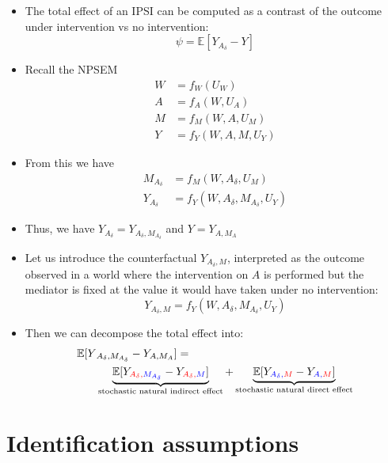 \documentclass[
  12pt,
]{book}
\theoremstyle{definition}
\theoremstyle{definition}
\theoremstyle{definition}
\newcommand{\E}{\mathbb{E}}
\newcommand{\1}{\mathbbm{1}}
\begin{document}
\begin{itemize}
\item
  The total effect of an IPSI can be computed as a contrast of the outcome under
  intervention vs no intervention:
  \begin{equation*}
    \psi = \E[Y_{A_\delta} - Y]
  \end{equation*}
\item
  Recall the NPSEM
  \begin{align}
    W & = f_W(U_W)\\
    A & = f_A(W, U_A)\\
    M & = f_M(W, A, U_M)\\
    Y & = f_Y(W, A, M, U_Y)
  \end{align}
\item
  From this we have
  \begin{align*}
  M_{A_\delta} & = f_M(W, A_\delta, U_M)\\
  Y_{A_\delta} & = f_Y(W, A_\delta, M_{A_\delta}, U_Y)
  \end{align*}
\item
  Thus, we have \(Y_{A_\delta} = Y_{A_\delta, M_{A_\delta}}\) and \(Y = Y_{A,M_{A}}\)
\item
  Let us introduce the counterfactual \(Y_{A_\delta, M}\), interpreted as the
  outcome observed in a world where the intervention on \(A\) is performed but the
  mediator is fixed at the value it would have taken under no intervention:
  \[Y_{A_\delta, M}  = f_Y(W, A_\delta, M_{A_\delta}, U_Y)\]
\item
  Then we can decompose the total effect into:
  \begin{align*}
    \E[Y&_{A_\delta,M_{A_\delta}} - Y_{A,M_A}] = \\
    &\underbrace{\E[Y_{\color{red}{A_\delta},\color{blue}{M_{A_\delta}}} -
      Y_{\color{red}{A_\delta},\color{blue}{M}}]}_{\text{stochastic natural indirect effect}} +
      \underbrace{\E[Y_{\color{blue}{A_\delta},\color{red}{M}} -
      Y_{\color{blue}{A},\color{red}{M}}]}_{\text{stochastic natural direct effect}}
  \end{align*}
\end{itemize}

\hypertarget{identification-assumptions-3}{%
\section{Identification assumptions}\label{identification-assumptions-3}}
\end{document}
